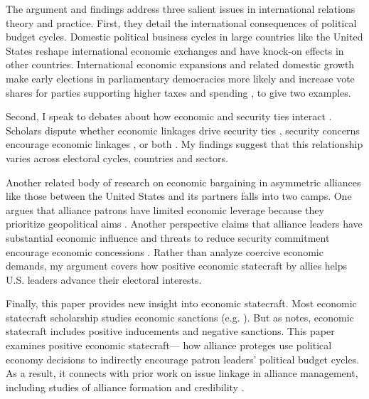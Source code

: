 \documentclass[12pt]{article}
\begin{document}
The argument and findings address three salient issues in international relations theory and practice. 
First, they detail the international consequences of political budget cycles. 
Domestic political business cycles in large countries like the United States reshape international economic exchanges and have knock-on effects in other countries.
International economic expansions and related domestic growth make early elections in parliamentary democracies more likely \citep{Kayser2006} and increase vote shares for parties supporting higher taxes and spending \citep{Kayser2009}, to give two examples.


Second, I speak to debates about how economic and security ties interact \citep{Mastanduno2009, Poast2019}. 
Scholars dispute whether economic linkages drive security ties \citep{BiglaiserDeRouen2007, Fordham2010, Kimball2010}, security concerns encourage economic linkages \citep{Gowa1995, Li2003, LongLeeds2006, GowaMansfield2004}, or both \citep{BiglaiserDeRouen2009, KinneBunte2018}. 
My findings suggest that this relationship varies across electoral cycles, countries and sectors.

Another related body of research on economic bargaining in asymmetric alliances like those between the United States and its partners falls into two camps. 
One argues that alliance patrons have limited economic leverage because they prioritize geopolitical aims \citep{Drezner2013, WolfordKim2017}.
Another perspective claims that alliance leaders have substantial economic influence \citep{Norrlof2010, Brooksetal2013} and threats to reduce security commitment encourage economic concessions \citep[pg. 122]{Oatley2015}.
Rather than analyze coercive economic demands, my argument covers how positive economic statecraft by allies helps U.S. leaders advance their electoral interests.


Finally, this paper provides new insight into economic statecraft. 
Most economic statecraft scholarship studies economic sanctions (e.g. \cite{Marinov2005, Allen2008, Escriba-FolchWright2010}).
But as \citet{Baldwin2020} notes, economic statecraft includes positive inducements and negative sanctions. 
This paper examines positive economic statecraft--- how alliance proteges use political economy decisions to indirectly encourage patron leaders' political budget cycles.
As a result, it connects with prior work on issue linkage in alliance management, including studies of alliance formation \citep{Poast2012} and credibility \citep{Davis2008, Poast2013}. 
\end{document}
